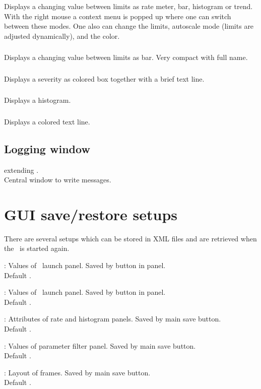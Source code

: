 \subsubsection{}
Displays a changing value between limits as rate meter, bar, histogram or trend.
With the right mouse a context menu is popped up where one can switch between these
modes. One also can change the limits, autoscale mode (limits are adjusted dynamically),
and the color.
\subsubsection{}
Displays a changing value between limits as bar. Very compact with full name.
\subsubsection{}
Displays a severity as colored box together with a brief text line.
\subsubsection{}
Displays a histogram.
\subsubsection{}
Displays a colored text line.
\subsection{Logging window}
 extending .\\
Central window to write messages.
\section{GUI save/restore setups}
There are several setups which can be stored in XML files and are retrieved
when the \gui\ is started again.
\bdes
\item [\keyw{DABC\_LAUNCH\_DABC}]: 
Values of \dabc\ launch panel. Saved by button in panel. \\
Default .
\item [\keyw{DABC\_LAUNCH\_MBS}]: 
Values of \mbs\ launch panel. Saved by button in panel. \\
Default .
\item [\keyw{DABC\_RECORD\_ATTRIBUTES}]: 
Attributes of rate and histogram panels. Saved by main save button. \\
Default .
\item [\keyw{DABC\_PARAMETER\_FILTER}]: 
Values of parameter filter panel. Saved by main save button. \\
Default .
\item [\keyw{DABC\_GUI\_LAYOUT}]: 
Layout of frames. Saved by main save button. \\
Default .
\edes
